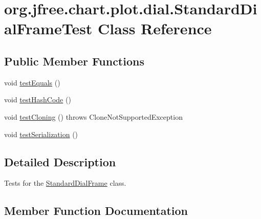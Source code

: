 \hypertarget{classorg_1_1jfree_1_1chart_1_1plot_1_1dial_1_1_standard_dial_frame_test}{}\section{org.\+jfree.\+chart.\+plot.\+dial.\+Standard\+Dial\+Frame\+Test Class Reference}
\label{classorg_1_1jfree_1_1chart_1_1plot_1_1dial_1_1_standard_dial_frame_test}
\subsection*{Public Member Functions}
\begin{DoxyCompactItemize}
\item 
void \mbox{\hyperlink{classorg_1_1jfree_1_1chart_1_1plot_1_1dial_1_1_standard_dial_frame_test_a55d51a3ddb2799650529a04c3f935db5}{test\+Equals}} ()
\item 
void \mbox{\hyperlink{classorg_1_1jfree_1_1chart_1_1plot_1_1dial_1_1_standard_dial_frame_test_af3b6ce75b0d5757a8bb6536c3677eaf6}{test\+Hash\+Code}} ()
\item 
void \mbox{\hyperlink{classorg_1_1jfree_1_1chart_1_1plot_1_1dial_1_1_standard_dial_frame_test_aadb05b50d11b2756c690f80b85e387b7}{test\+Cloning}} ()  throws Clone\+Not\+Supported\+Exception 
\item 
void \mbox{\hyperlink{classorg_1_1jfree_1_1chart_1_1plot_1_1dial_1_1_standard_dial_frame_test_a76077dca4d6dd1c8197cc4493f745077}{test\+Serialization}} ()
\end{DoxyCompactItemize}


\subsection{Detailed Description}
Tests for the \mbox{\hyperlink{classorg_1_1jfree_1_1chart_1_1plot_1_1dial_1_1_standard_dial_frame}{Standard\+Dial\+Frame}} class. 

\subsection{Member Function Documentation}
\mbox{\label{classorg_1_1jfree_1_1chart_1_1plot_1_1dial_1_1_standard_dial_frame_test_aadb05b50d11b2756c690f80b85e387b7}} 
